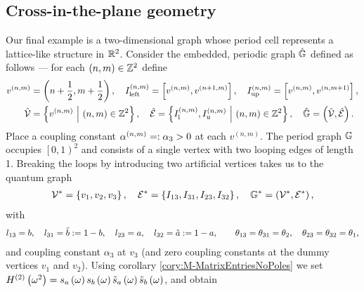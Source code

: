 \subsection{Cross-in-the-plane geometry} \label{ssec:ExampleCrossInPlane}
Our final example is a two-dimensional graph whose period cell represents a lattice-like structure in $\mathbb{R}^2$.
Consider the embedded, periodic graph $\hat{\mathbb{G}}$ defined as follows --- for each $\left( n,m \right)\in\mathbb{Z}^2$ define
\begin{align*}
	v^{(n,m)} &= \left( n+\frac{1}{2}, m+\frac{1}{2} \right), \quad
	I_{\mathrm{left}}^{\left( n,m \right)} = \left[ v^{\left( n,m \right)}, v^{\left( n+1,m \right)} \right], \quad
	I_{\mathrm{up}}^{\left( n,m \right)} = \left[ v^{\left( n,m \right)}, v^{\left( n,m+1 \right)} \right], \\
	\hat{\mathcal{V}} &= \left\{ v^{\left( n,m \right)} \ \middle\vert \  \left( n,m \right)\in\mathbb{Z}^2 \right\}, \quad
	\hat{\mathcal{E}} = \left\{  I_{\mathrm{l}}^{\left( n,m \right)}, I_{\mathrm{u}}^{\left( n,m \right)} \ \middle\vert \  \left( n,m \right)\in\mathbb{Z}^2 \right\}, \quad
	\hat{\mathbb{G}} = \left( \hat{\mathcal{V}}, \hat{\mathcal{E}} \right).
\end{align*}
Place a coupling constant $\alpha^{\left( n,m \right)} =: \alpha_3>0$ at each $v^{(n,m)}$.
The period graph $\mathbb{G}$ occupies $\left[0,1\right)^2$ and consists of a single vertex with two looping edges of length 1.
Breaking the loops by introducing two artificial vertices takes us to the quantum graph
\begin{align*}
	\mathcal{V}^* = \left\{ v_1, v_2, v_3 \right\}, \quad
	\mathcal{E}^* = \left\{ I_{13}, I_{31}, I_{23}, I_{32} \right\}, \quad
	\mathbb{G}^* = \left( \mathcal{V}^*, \mathcal{E}^* \right),
\end{align*}
with
\begin{align*}
	l_{13} = b, \quad l_{31} = \tilde{b} := 1-b, \quad 
	l_{23} = a, \quad l_{32} = \tilde{a} := 1-a, \qquad
	\theta_{13} = \theta_{31} = \theta_2, \quad \theta_{23} = \theta_{32} = \theta_1,
\end{align*}
and coupling constant $\alpha_3$ at $v_3$ (and zero coupling constants at the dummy vertices $v_1$ and $v_2$).
Using corollary \ref{cory:M-MatrixEntriesNoPoles} we set $H^{(2)}\left( \omega^2 \right) = s_a\left( \omega \right) s_b\left( \omega \right) \tilde{s}_a\left( \omega \right) \tilde{s}_b\left( \omega \right)$, and obtain
